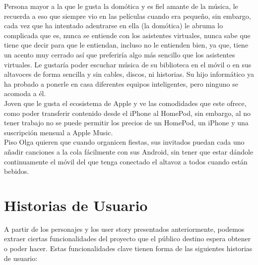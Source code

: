 Persona mayor a la que le gusta la domótica y es fiel amante de la música, le recuerda a eso que siempre vio en las películas cuando era pequeño, sin embargo, cada vez que ha intentado adentrarse en ella (la domótica) le abruma lo complicada que es, nunca se entiende con los asistentes virtuales, nunca sabe que tiene que decir para que le entiendan, incluso no le entienden bien, ya que, tiene un acento muy cerrado así que preferiría algo más sencillo que los asistentes virtuales. Le gustaría poder escuchar música de su biblioteca en el móvil o en sus altavoces de forma sencilla y sin cables, discos, ni historias. Su hijo informático ya ha probado a ponerle en casa diferentes equipos inteligentes, pero ninguno se acomoda a él.\\

Joven que le gusta el ecosistema de Apple y ve las comodidades que este ofrece, como poder transferir contenido desde el iPhone al HomePod, sin embargo, al no tener trabajo no se puede permitir los precios de un HomePod, un iPhone y una suscripción mensual a Apple Music.\\

Piso Olga quieren que cuando organicen fiestas, sus invitados puedan cada uno añadir canciones a la cola fácilmente con sus Android, sin tener que estar dándole continuamente el móvil del que tenga conectado el altavoz a todos cuando están bebidos.\\

\section{Historias de Usuario}
A partir de los personajes y los user story presentados anteriormente, podemos extraer ciertas funcionalidades del proyecto que el público destino espera obtener o poder hacer. Estas funcionalidades clave tienen forma de las siguientes historias de usuario:

